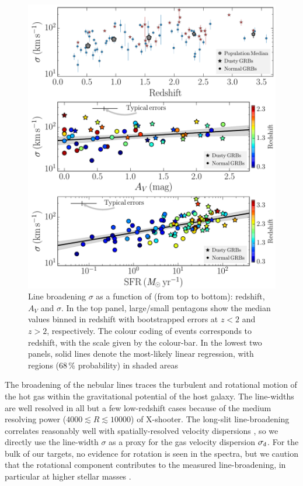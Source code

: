 \documentclass[traditabstract, longauth]{aa}
\begin{document}
\begin{figure}
\includegraphics[angle=0, width=0.99\columnwidth]{Figs/Velo_z.pdf}
\caption{Line broadening $\sigma$ as a function of (from top to bottom): redshift, $A_V$ and $\sigma$. In the top panel, large/small pentagons show the median values binned in redshift with bootstrapped errors at $z<2$ and $z>2$, respectively. The colour coding of events corresponds to redshift, with the scale given by the colour-bar. In the lowest two panels, solid lines denote the most-likely linear regression, with regions (68\,\% probability) in shaded areas}
\label{fig:veloz}
\end{figure}

The broadening of the nebular lines traces the turbulent and rotational motion of the hot gas within the gravitational potential of the host galaxy. The line-widths are well resolved in all but a few low-redshift cases because of the medium resolving power ($4000\lesssim R \lesssim 10000$) of X-shooter. The long-slit line-broadening correlates reasonably well with spatially-resolved velocity dispersions \citep{2011MNRAS.413..643R}, so we directly use the line-width $\sigma$ as a proxy for the gas velocity dispersion $\sigma_{\rm{d}}$. For the bulk of our targets, no evidence for rotation is seen in the spectra, but we caution that the rotational component contributes to the measured line-broadening, in particular at higher stellar masses \citep[e.g.,][]{2009ApJ...706.1364F}.
\end{document}
